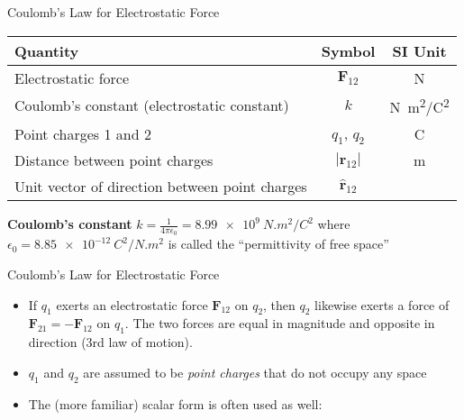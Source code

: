 \documentclass[12pt,aspectratio=169]{beamer}
\begin{document}
\begin{frame}{Coulomb's Law for Electrostatic Force}
  \begin{center}
    \begin{tabular}{l|c|c}
      \rowcolor{pink}
      \textbf{Quantity} & \textbf{Symbol} & \textbf{SI Unit} \\ \hline
      Electrostatic force            & $\bm{F}_{12}$ & \si{\newton} \\
      Coulomb's constant (electrostatic constant) & $k$ & \si{N.m^2/C^2} \\
      Point charges 1 and 2  & $q_1$, $q_2$ &  \si{\coulomb} \\
      Distance between point charges & $|\bm{r}_{12}|$ & \si{\metre} \\
      Unit vector of direction between point charges & $\hat{\bm{r}}_{12}$ &
    \end{tabular}
  \end{center}

  \vspace{-.1in}\textbf{Coulomb's constant}
  $\displaystyle k=\frac1{4\pi\epsilon_0}=\SI{8.99e9}{N.m^2/C^2}$ where
  $\epsilon_0=\SI{8.85e-12}{C^2/N.m^2}$ is called the
  ``permittivity of free space''
\end{frame}



\begin{frame}{Coulomb's Law for Electrostatic Force}
  \begin{center}
  \end{center}
  \begin{itemize}
  \item\vspace{-.15in}If $q_1$ exerts an electrostatic force $\bm{F}_{12}$ on
    $q_2$, then $q_2$ likewise exerts a force of $\bm{F}_{21}=-\bm{F}_{12}$
    on $q_1$. The two forces are equal in magnitude and opposite in direction
    (3rd law of motion).
  \item $q_1$ and $q_2$ are assumed to be \emph{point charges} that do not
    occupy  any space
  \item The (more familiar) scalar form is often used as well:

  \end{itemize}
\end{frame}
\end{document}
